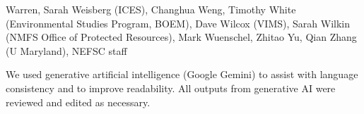 \documentclass[
  10pt,
]{article}
\begin{document}
Warren, Sarah Weisberg (ICES), Changhua Weng, Timothy White (Environmental Studies Program, BOEM), Dave Wilcox (VIMS), Sarah Wilkin (NMFS Office of Protected Resources), Mark Wuenschel, Zhitao Yu, Qian Zhang (U Maryland), NEFSC staff

We used generative artificial intelligence (Google Gemini) to assist with language consistency and to improve readability. All outputs from generative AI were reviewed and edited as necessary.
\end{document}

